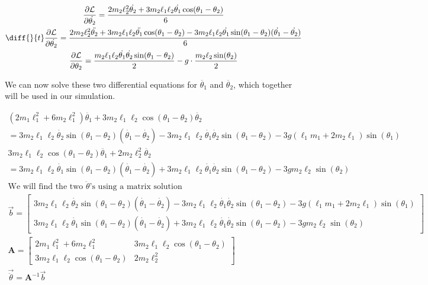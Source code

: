 \documentclass[]{article}
\begin{document}
\begin{gather*}
	\frac{\partial \lagr}{\partial \dot{\theta_2}} = \frac{2m_2\ell_2^2\dot{\theta_2} + 3m_2\ell_1\ell_2\dot{\theta_1}\cos(\theta_1 - \theta_2)}{6} \\
	\diff{}{t}\frac{\partial \lagr}{\partial \dot{\theta_2}} = \frac{2m_2\ell_2^2\ddot{\theta_2} + 3m_2\ell_1\ell_2\ddot{\theta_1}\cos(\theta_1 - \theta_2) - 3m_2\ell_1\ell_2\dot{\theta_1}\sin(\theta_1 - \theta_2)(\dot{\theta_1} - \dot{\theta_2})}{6} \\
	\frac{\partial \lagr}{\partial \theta_2} = \frac{m_2\ell_1\ell_2\dot{\theta_1}\dot{\theta_2}\sin(\theta_1 - \theta_2)}{2} - g\cdot\frac{m_2\ell_2\sin(\theta_2)}{2}
\end{gather*}

We can now solve these two differential equations for $\ddot{\theta_1}$ and $\ddot{\theta_2}$, which together will be used in our simulation.

\begin{gather*}
	(2m_1\ell_1^2 + 6m_2\ell_1^2)\ddot{\theta_1} + 3m_2\ell_1\ell_2\cos(\theta_1 - \theta_2)\ddot{\theta_2} \\
	= 3 m_2\ell_1\ell_2\dot{\theta_2}\sin(\theta_1 - \theta_2)(\dot{\theta_1} - \dot{\theta_2}) - 3m_2\ell_1\ell_2\dot{\theta_1}\dot{\theta_2}\sin(\theta_1 - \theta_2) - 3g(\ell_1m_1 + 2m_2\ell_1)\sin(\theta_1) \\
	3m_2\ell_1\ell_2\cos(\theta_1 - \theta_2)\ddot{\theta_1} + 2m_2\ell_2^2\ddot{\theta_2} \\ 
	= 3m_2\ell_1\ell_2\dot{\theta_1}\sin(\theta_1 - \theta_2)(\dot{\theta_1} - \dot{\theta_2}) + 3m_2\ell_1\ell_2\dot{\theta_1}\dot{\theta_2}\sin(\theta_1 - \theta_2) - 3g m_2\ell_2\sin(\theta_2) \\
	\text{We will find the two $\ddot{\theta}$'s using a matrix solution} \\
	\vec{b} = \begin{bmatrix}
		3 m_2\ell_1\ell_2\dot{\theta_2}\sin(\theta_1 - \theta_2)(\dot{\theta_1} - \dot{\theta_2}) - 3m_2\ell_1\ell_2\dot{\theta_1}\dot{\theta_2}\sin(\theta_1 - \theta_2) - 3g(\ell_1m_1 + 2m_2\ell_1)\sin(\theta_1) \\
		3m_2\ell_1\ell_2\dot{\theta_1}\sin(\theta_1 - \theta_2)(\dot{\theta_1} - \dot{\theta_2}) + 3m_2\ell_1\ell_2\dot{\theta_1}\dot{\theta_2}\sin(\theta_1 - \theta_2) - 3g m_2\ell_2\sin(\theta_2)
	\end{bmatrix} \\
	\boldsymbol{A} = \begin{bmatrix}
		2m_1\ell_1^2 + 6m_2\ell_1^2 & 3m_2\ell_1\ell_2\cos(\theta_1 - \theta_2) \\
		3m_2\ell_1\ell_2\cos(\theta_1 - \theta_2) & 2m_2\ell_2^2
	\end{bmatrix} \\
	\vec{\ddot{\theta}} = \boldsymbol{A}^{-1}\vec{b}
\end{gather*}
\end{document}
